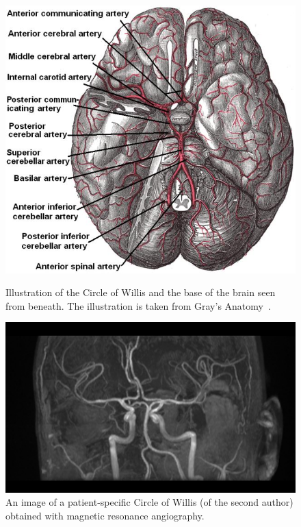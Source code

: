 \begin{figure}
  \centering
  \includegraphics[width=\largefig]{chapters/kvs-2/png/cow_gray_1.png} \\
  \caption{Illustration of the Circle of Willis and the base of the brain
      seen from beneath. The illustration is taken from Gray's Anatomy~\citep{Gray1897}.}
  \label{fig:kvs-2:textbook-circle}
\end{figure}

\begin{figure}
\bwfig
  \centering
  \includegraphics[width=\largefig]{chapters/kvs-2/pdf/kentus.pdf}
  \caption{An image of a patient-specific Circle of Willis (of the second author) obtained with magnetic resonance angiography.}
  \label{fig:kvs-2:circle_kent}
\end{figure}

